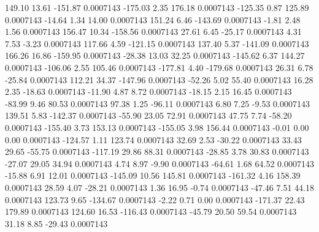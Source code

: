       149.10       13.61     -151.87     0.0007143
     -175.03        2.35      176.18     0.0007143
     -125.35        0.87      125.89     0.0007143
      -14.64        1.34       14.00     0.0007143
      151.24        6.46     -143.69     0.0007143
       -1.81        2.48        1.56     0.0007143
      156.47       10.34     -158.56     0.0007143
       27.61        6.45      -25.17     0.0007143
        4.31        7.53       -3.23     0.0007143
      117.66        4.59     -121.15     0.0007143
      137.40        5.37     -141.09     0.0007143
      166.26       16.86     -159.95     0.0007143
      -28.38       13.03       32.25     0.0007143
     -145.62        6.37      144.27     0.0007143
     -106.06        2.55      105.46     0.0007143
     -177.81        4.40     -179.68     0.0007143
       26.31        6.78      -25.84     0.0007143
      112.21       34.37     -147.96     0.0007143
      -52.26        5.02       55.40     0.0007143
       16.28        2.35      -18.63     0.0007143
      -11.90        4.87        8.72     0.0007143
      -18.15        2.15       16.45     0.0007143
      -83.99        9.46       80.53     0.0007143
       97.38        1.25      -96.11     0.0007143
        6.80        7.25       -9.53     0.0007143
      139.51        5.83     -142.37     0.0007143
      -55.90       23.05       72.91     0.0007143
       47.75        7.74      -58.20     0.0007143
     -155.40        3.73      153.13     0.0007143
     -155.05        3.98      156.44     0.0007143
       -0.01        0.00        0.00     0.0007143
     -124.57        1.11      123.74     0.0007143
       32.69        2.53      -30.22     0.0007143
       33.43       29.65      -55.75     0.0007143
     -117.19       29.86       88.31     0.0007143
      -28.85        3.78       30.83     0.0007143
      -27.07       29.05       34.94     0.0007143
        4.74        8.97       -9.90     0.0007143
      -64.61        1.68       64.52     0.0007143
      -15.88        6.91       12.01     0.0007143
     -145.09       10.56      145.81     0.0007143
     -161.32        4.16      158.39     0.0007143
       28.59        4.07      -28.21     0.0007143
        1.36       16.95       -0.74     0.0007143
      -47.46        7.51       44.18     0.0007143
      123.73        9.65     -134.67     0.0007143
       -2.22        0.71        0.00     0.0007143
     -171.37       22.43      179.89     0.0007143
      124.60       16.53     -116.43     0.0007143
      -45.79       20.50       59.54     0.0007143
       31.18        8.85      -29.43     0.0007143
